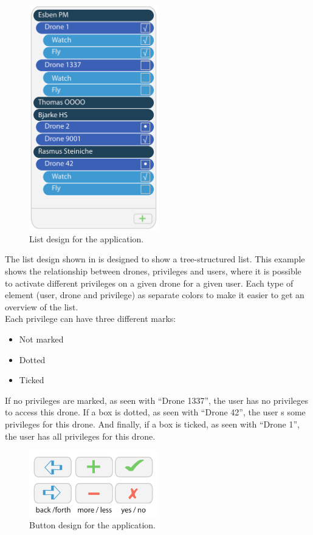\begin{figure}[htb]
    \centering
    \includegraphics[width=0.5\textwidth]{gfx/list.pdf}
    \caption{List design for the application.}
    \label{fig:list_design}
\end{figure}
The list design shown in  is designed to show a tree-structured list.
This example shows the relationship between drones, privileges and users, where it is possible to activate different privileges on a given drone for a given user.
Each type of element (user, drone and privilege) as separate colors to make it easier to get an overview of the list. \\

Each privilege can have three different marks:

\begin{itemize}
    \item Not marked
    \item Dotted
    \item Ticked
\end{itemize}

If no privileges are marked, as seen with ``Drone 1337'', the user has no privileges to access this drone.
If a box is dotted, as seen with ``Drone 42'', the user s some privileges for this drone.
And finally, if a box is ticked, as seen with ``Drone 1'', the user has all privileges for this drone.

\begin{figure}[htb]
    \centering
    \includegraphics[width=0.5\textwidth]{gfx/button.pdf}
    \caption{Button design for the application.}
    \label{fig:button_design}
\end{figure}

